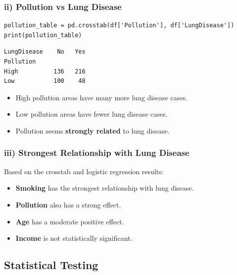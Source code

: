 \documentclass[12pt,a4paper]{article}
\begin{document}
\subsubsection{ii) Pollution vs Lung Disease}

\begin{lstlisting}
pollution_table = pd.crosstab(df['Pollution'], df['LungDisease'])
print(pollution_table)
\end{lstlisting}

\begin{outputbox}
\begin{verbatim}
LungDisease    No   Yes
Pollution
High          136   216
Low           100    48
\end{verbatim}
\end{outputbox}

\begin{interpbox}
\begin{itemize}[noitemsep]
  \item High pollution areas have many more lung disease cases.
  \item Low pollution areas have fewer lung disease cases.
  \item Pollution seems \textbf{strongly related} to lung disease.
\end{itemize}
\end{interpbox}

\subsubsection{iii) Strongest Relationship with Lung Disease}

\begin{interpbox}
Based on the crosstab and logistic regression results:
\begin{itemize}[noitemsep]
  \item \textbf{Smoking} has the strongest relationship with lung disease.
  \item \textbf{Pollution} also has a strong effect.
  \item \textbf{Age} has a moderate positive effect.
  \item \textbf{Income} is not statistically significant.
\end{itemize}
\end{interpbox}

\subsection{Statistical Testing}
\end{document}
